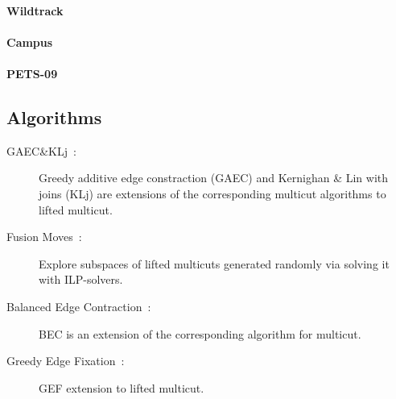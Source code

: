 \paragraph{Wildtrack}
\paragraph{Campus}
\paragraph{PETS-09}

\subsection{Algorithms}
\begin{description}
\item[GAEC\&KLj~\cite{keuper2015efficient}:] Greedy additive edge constraction (GAEC) and Kernighan \& Lin with joins (KLj) are extensions of the corresponding multicut algorithms to lifted multicut.
\item[Fusion Moves~\cite{beier2017multicut}:] Explore subspaces of lifted multicuts generated randomly via solving it with ILP-solvers.
\item[Balanced Edge Contraction~\cite{kardoost2018solving}:] BEC is an extension of the corresponding algorithm for multicut.
\item[Greedy Edge Fixation~\cite{levinkov2019comparative}:] GEF extension to lifted multicut.
\end{description}
